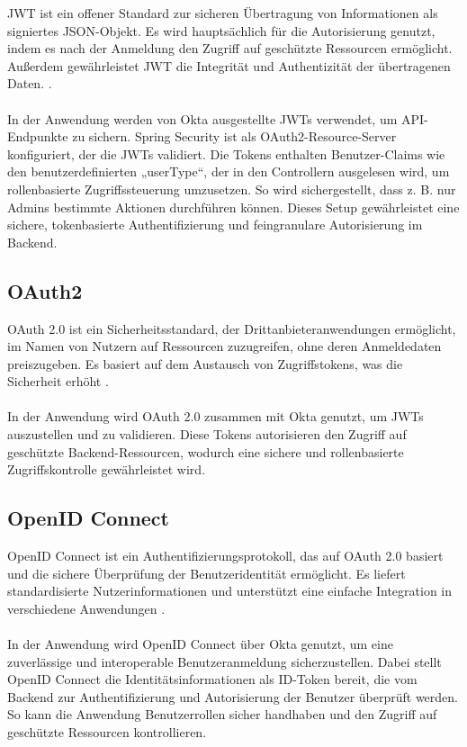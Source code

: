 JWT ist ein offener Standard zur sicheren Übertragung von Informationen als signiertes JSON-Objekt. Es wird hauptsächlich für die Autorisierung genutzt, indem es nach der Anmeldung den Zugriff auf geschützte Ressourcen ermöglicht. Außerdem gewährleistet JWT die Integrität und Authentizität der übertragenen Daten. \cite{JWT:o.J}.  \\ \\
In der Anwendung werden von Okta ausgestellte JWTs verwendet, um API-Endpunkte zu sichern. Spring Security ist als OAuth2-Resource-Server konfiguriert, der die JWTs validiert. Die Tokens enthalten Benutzer-Claims wie den benutzerdefinierten „userType“, der in den Controllern ausgelesen wird, um rollenbasierte Zugriffssteuerung umzusetzen. So wird sichergestellt, dass z. B. nur Admins bestimmte Aktionen durchführen können. Dieses Setup gewährleistet eine sichere, tokenbasierte Authentifizierung und feingranulare Autorisierung im Backend.


\subsection{OAuth2}
OAuth 2.0 ist ein Sicherheitsstandard, der Drittanbieteranwendungen ermöglicht, im Namen von Nutzern auf Ressourcen zuzugreifen, ohne deren Anmeldedaten preiszugeben. Es basiert auf dem Austausch von Zugriffstokens, was die Sicherheit erhöht \cite{OAuth2:2023}.  \\ \\
In der Anwendung wird OAuth 2.0 zusammen mit Okta genutzt, um JWTs auszustellen und zu validieren. Diese Tokens autorisieren den Zugriff auf geschützte Backend-Ressourcen, wodurch eine sichere und rollenbasierte Zugriffskontrolle gewährleistet wird.

\subsection{OpenID Connect}
OpenID Connect ist ein Authentifizierungsprotokoll, das auf OAuth 2.0 basiert und die sichere Überprüfung der Benutzeridentität ermöglicht. Es liefert standardisierte Nutzerinformationen und unterstützt eine einfache Integration in verschiedene Anwendungen \cite{OpenId:o.J}. \\ \\
In der Anwendung wird OpenID Connect über Okta genutzt, um eine zuverlässige und interoperable Benutzeranmeldung sicherzustellen. Dabei stellt OpenID Connect die Identitätsinformationen als ID-Token bereit, die vom Backend zur Authentifizierung und Autorisierung der Benutzer überprüft werden. So kann die Anwendung Benutzerrollen sicher handhaben und den Zugriff auf geschützte Ressourcen kontrollieren.


